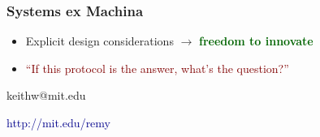 \documentclass[svgnames]{beamer}
\begin{document}
\begin{frame}

\frametitle{Systems ex Machina}

\begin{itemize}

\item Explicit design considerations $\rightarrow$ \textbf{\textcolor{DarkGreen}{freedom to innovate}}

\item \textcolor{Maroon}{``If this protocol is the answer, what's the question?''}

%
%
%
%

\end{itemize}

\vspace{\baselineskip}

\begin{centering}
keithw@mit.edu

\vspace{7 pt}

\textcolor{DarkBlue}{http://mit.edu/remy}

\end{centering}

\end{frame}
\end{document}
